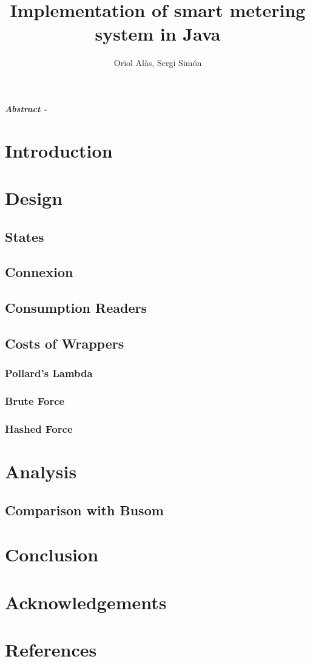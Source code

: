 \documentclass{article}
\title{Implementation of smart metering system in Java}
\author{Oriol Alàs, Sergi Simón}
\begin{document}
   \maketitle
   
   \textbf{\textit{Abstract - }}
   \section{Introduction}
   \section{Design}
   \subsection{States}
   \subsection{Connexion}
   \subsection{Consumption Readers}
   \subsection{Costs of Wrappers}
   \subsubsection{Pollard's Lambda}
   \subsubsection{Brute Force}
   \subsubsection{Hashed Force}
   \section{Analysis}
   \subsection{Comparison with Busom}
   \section{Conclusion}
   \section{Acknowledgements}
   \section{References}
\end{document}
